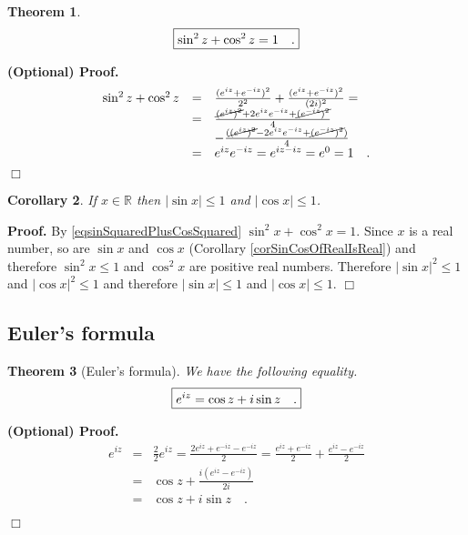 \documentclass[12pt]{book}
\newcommand{\importantFormula}[1]{\begin{equation} \boxed{#1} \end{equation}}
\newenvironment{proof}[1][]{ \textbf{Proof#1.} }{$\Box$\medskip}
\newenvironment{proofOptional}[1][]{ \noindent \textbf{(Optional) Proof#1.}}{$\Box$\medskip}
\newtheorem{theorem}{Theorem}[section]
\newtheorem{corollary}[theorem]{Corollary}
\begin{document}
\begin{theorem}
\importantFormula{\label{eqsinSquaredPlusCosSquared}
\sin^2 z +\cos^2 z= 1\quad .
}

\end{theorem}
\begin{proofOptional}
\begin{equation*}
\begin{array}{rcl}
\sin^2 z +\cos^2 z&=& \frac{(e^{iz}+e^{-iz})^2}{2^2}+\frac{(e^{iz}+e^{-iz})^2}{(2i)^2}=\\
&=&\frac{ \cancel{(e^{iz})^2} + 2 e^{iz}e^{-iz} + \cancel{(e^{-iz})^2}}{4} \\
&&-\frac{(\cancel{(e^{iz})^2}-2e^{iz}e^{-iz} + \cancel{(e^{-iz})^2})}{4} \\&=& e^{iz}e^{-iz}= e^{iz-iz}=e^0=1\quad .
\end{array}
\end{equation*}
\end{proofOptional}
\begin{corollary}
If $x\in \mathbb R$ then $|\sin x|\leq 1$ and $|\cos x| \leq 1$.
\end{corollary}
\begin{proof}
By  \eqref{eqsinSquaredPlusCosSquared} $\sin^2 x+\cos ^2 x=1$. Since $x$ is a real number, so are $\sin x$ and $\cos x$ (Corollary \ref{corSinCosOfRealIsReal}) and therefore $\sin^2x\leq 1$ and $\cos^2 x$ are positive real numbers. Therefore  $|\sin x|^2\leq 1$ and $|\cos x|^2\leq 1$ and therefore $|\sin x|\leq 1$ and $|\cos x|\leq 1$.
\end{proof}
\subsection{Euler's formula}
\begin{theorem}[Euler's formula]
We have the following equality.
\importantFormula{\label{eqEulerExp}
e^{iz}= \cos z+ i\sin z \quad .
}
\end{theorem}
\begin{proofOptional}
\[
\begin{array}{rcl}
\displaystyle e^{iz}&=&\displaystyle  \frac{2}{2}e^{iz}= \frac{2e^{iz} + e^{-iz} - e^{-iz}}{2} = \frac{e^{iz}+e^{-iz}}2 +\frac{e^{iz}-e^{-iz}}2\\
&=& \cos z + \frac{i(e^{iz}-e^{-iz})}{2i}\\
&=& \displaystyle \cos z+i \sin z\quad .
\end{array}
\]

\end{proofOptional}
\end{document}
